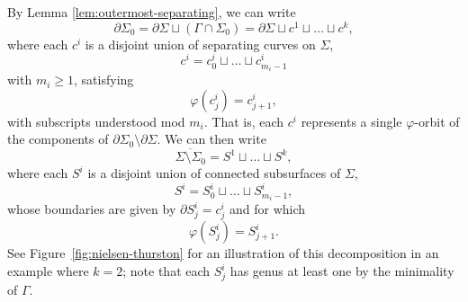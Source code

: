 \documentclass[11pt]{amsart}
\numberwithin{equation}{section}
\numberwithin{theorem}{section}
\theoremstyle{definition}
\begin{document}
By Lemma \ref{lem:outermost-separating}, we can write \begin{equation*}\label{eqn:notation-sat} \partial\Sigma_0 = \partial\Sigma \sqcup (\Gamma \cap \Sigma_0) = \partial\Sigma \sqcup c^1 \sqcup \dots \sqcup c^{k}, \end{equation*}
where each $c^i$ is a disjoint union of  separating curves on $\Sigma$, \[c^i = c^i_0\sqcup \dots \sqcup c^i_{m_i-1}\] with $m_i\geq 1$, satisfying \[\varphi(c^i_j) = c^i_{j+1},\] with subscripts understood mod $m_i$. That is, each $c^i$ represents a single $\varphi$-orbit of  the components of $\partial \Sigma_0\setminus \partial \Sigma$. We can then write \[ \overline{\Sigma \setminus \Sigma_0} =  S^1 \sqcup \dots \sqcup S^{k}, \] where each $S^i$ is a disjoint union of connected subsurfaces of $\Sigma$, \[S^i = S^i_0\sqcup \dots \sqcup S^i_{m_i-1}, \] whose boundaries are given by $\partial S^i_j = c^i_j$ and for which \[\varphi(S^i_j) = S^i_{j+1}.\] See Figure~\ref{fig:nielsen-thurston} for an illustration of this decomposition in an example where $k=2$; note that each $S^i_j$ has genus at least one by the minimality of $\Gamma$.
\end{document}
